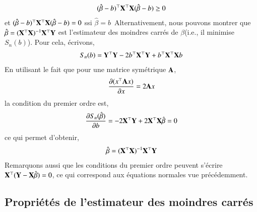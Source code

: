 \documentclass[10pt, reqno]{amsart}
\begin{document}
\begin{align*}
(\hat{\beta}-b)^\top \mathbf X ^\top\mathbf X  (\hat{\beta}-b) \geq 0
\end{align*}
et $(\hat{\beta}-b)^\top \mathbf X ^\top\mathbf X  (\hat{\beta}-b) = 0$ ssi $\hat{\beta} = b$\
Alternativement, nous pouvons montrer que $\hat{\beta}=(\mathbf X ^\top\mathbf X )^{-1}\mathbf X ^\top\mathbf Y$ est l'estimateur des moindres carrés de $\beta$(i.e., il minimise $S_n(b)$). Pour cela, écrivons,
\begin{align*}
S_n(b) = \mathbf Y^\top\mathbf Y - 2b^\top\mathbf X ^\top\mathbf Y+b^\top\mathbf X ^\top\mathbf X b
\end{align*}
En utilisant le fait que pour une matrice symétrique $\mathbf A$,
\begin{align*}
\frac{\partial (x^\top\mathbf A x)}{\partial x} = 2\mathbf A x
\end{align*}
la condition du premier ordre est,
\begin{align*}
\frac{\partial S_n(\hat{\beta})}{\partial b} = -2\mathbf X ^\top\mathbf Y + 2\mathbf X ^\top\mathbf X \hat{\beta} = 0
\end{align*}
ce qui permet d'obtenir,
\begin{align*}
\hat{\beta} = (\mathbf X ^\top\mathbf X )^{-1}\mathbf X ^\top\mathbf Y
\end{align*}
Remarquons aussi que les conditions du premier ordre peuvent s'écrire $\mathbf X ^\top(\mathbf Y - \mathbf X \hat{\beta}) = 0$, ce qui correspond aux équations normales vue précédemment.

\subsection{Propriétés de l'estimateur des moindres carrés}
\end{document}
